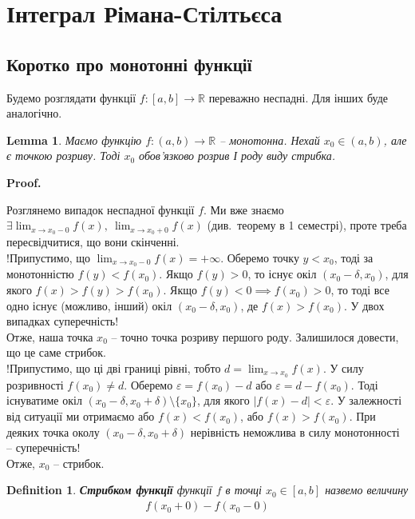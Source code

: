 \documentclass[a4paper, 10pt]{article}
\makeatletter
\def\qed{$\blacksquare$}
\theoremstyle{theoremdd}
\theoremstyle{theoremdd}
\theoremstyle{theoremdd}
\newtheorem{definition}[theorem]{Definition}
\theoremstyle{theoremdd}
\theoremstyle{theoremdd}
\theoremstyle{theoremdd}
\theoremstyle{theoremdd}
\theoremstyle{theoremdd}
\newtheorem{lemma}[theorem]{Lemma}
\theoremstyle{theoremdd}
\renewenvironment{proof}[1][Proof.\\]{\par
\pushQED{\hfill \qed}%
\normalfont \topsep6\p@\@plus6\p@\relax
\trivlist
\item\relax
{\bfseries
#1\@addpunct{.}}\hspace\labelsep\ignorespaces
}{%
\popQED\endtrivlist\@endpefalse
}
\makeatother
\begin{document}
\section{Інтеграл Рімана-Стілтьєса}
\subsection{Коротко про монотонні функції}
Будемо розглядати функції $f \colon [a,b] \to \mathbb{R}$ переважно неспадні. Для інших буде аналогічно.

\begin{lemma}
Маємо функцію $f \colon (a,b) \to \mathbb{R}$ -- монотонна. Нехай $x_0 \in (a,b)$, але є точкою розриву. Тоді $x_0$ обов'язково розрив І роду виду стрибка.
\end{lemma}

\begin{proof}
Розглянемо випадок неспадної функції $f$. Ми вже знаємо $\exists \displaystyle\lim_{x \to x_0-0} f(x),\ \displaystyle\lim_{x \to x_0+0} f(x)$ (див.\ теорему в 1 семестрі), проте треба пересвідчитися, що вони скінченні.\\
!Припустимо, що $\displaystyle\lim_{x \to x_0-0} f(x) = +\infty$. Оберемо точку $y < x_0$, тоді за монотонністю $f(y) < f(x_0)$. Якщо $f(y) > 0$, то існує окіл $(x_0-\delta,x_0)$, для якого $f(x) > f(y) > f(x_0)$. Якщо $f(y) < 0 \implies f(x_0) > 0$, то тоді все одно існує (можливо, інший) окіл $(x_0-\delta,x_0)$, де $f(x) > f(x_0)$. У двох випадках суперечність!\\
Отже, наша точка $x_0$ -- точно точка розриву першого роду. Залишилося довести, що це саме стрибок.\\
!Припустимо, що ці дві границі рівні, тобто $d = \displaystyle\lim_{x \to x_0} f(x)$. У силу розривності $f(x_0) \neq d$. Оберемо $\varepsilon = f(x_0) - d$ або $\varepsilon = d - f(x_0)$. Тоді існуватиме окіл $(x_0-\delta,x_0+\delta) \setminus \{x_0\}$, для якого $|f(x)-d| < \varepsilon$. У залежності від ситуації ми отримаємо або $f(x) < f(x_0)$, або $f(x) > f(x_0)$. При деяких точка околу $(x_0-\delta,x_0+\delta)$ нерівність неможлива в силу монотонності -- суперечність!\\
Отже, $x_0$ -- стрибок. 
\end{proof}

\begin{definition}
\textbf{Стрибком функції} функції $f$ в точці $x_0 \in [a,b]$ назвемо величину
\begin{align*}
f(x_0+0) - f(x_0-0)
\end{align*}
\end{definition}
\end{document}

